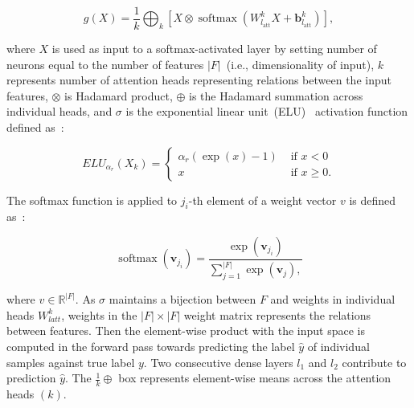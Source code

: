 \begin{equation}
    g(X)=\frac{1}{k} \bigoplus_{k}\left[X \otimes \operatorname{softmax}\left(W_{l_{\mathrm{att}}}^{k} X+\boldsymbol{b}_{l_{\mathrm{att}}}^{k}\right)\right],
\end{equation}

\hspace*{3.5mm} where $X$ is used as input to a softmax-activated layer by setting number of neurons equal to the number of features $|F|$~(i.e., dimensionality of input), $k$ represents number of attention heads representing relations between the input features, $\otimes$ is Hadamard product, $\oplus$ is the Hadamard summation across individual heads, and $\sigma$ is the exponential linear unit~(ELU)~\cite{clevert2015fast} activation function defined as~\cite{clevert2015fast}: 

\begin{equation}
    ELU_{\alpha_r}(X_k)=\left\{\begin{array}{ll}
    \alpha_r(\exp (x)-1) & \text { if } x<0 \\
    x & \text { if } x \geq 0.
    \end{array}\right.
    \label{eq:elu_activation}
\end{equation}

\hspace*{3.5mm} The softmax function is applied to $j_{i}$-th element of a weight vector $v$ is defined as~\cite{vskrlj2020feature}:

\begin{equation}
    \operatorname{softmax}\left(\boldsymbol{v}_{j_{i}}\right)=\frac{\exp \left(\boldsymbol{v}_{j_{i}}\right)}{\sum_{j=1}^{|F|} \exp \left(\boldsymbol{v}_{j}\right),}
\end{equation}

\hspace*{3.5mm} where $v \in \mathbb{R}^{|F|}$. As $\sigma$ maintains a bijection between $F$ and weights in individual heads $W_{latt}^{k}$, weights in the $|F| \times|F|$ weight matrix represents the relations between features. Then the element-wise product with the input space is computed in the forward pass towards predicting the label $\hat{y}$ of individual samples against true label ${y}$. Two consecutive dense layers $l_{1}$ and $l_{2}$ contribute to prediction $\hat{y}$. The $\frac{1}{k} \oplus$ box represents element-wise means across the attention heads $(k)$. 

